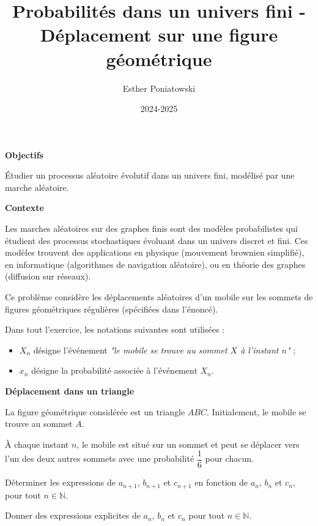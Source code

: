 \documentclass[10pt,a4paper]{article}
\title{Probabilités dans un univers fini - Déplacement sur une figure géométrique}
\author{Esther Poniatowski}
\date{2024-2025}
\begin{document}
\textbf{Objectifs}

Étudier un processus aléatoire évolutif dans un univers fini, modélisé par une marche aléatoire.

\bigskip
\textbf{Contexte}

Les marches aléatoires sur des graphes finis sont des modèles probabilistes qui étudient des
processus stochastiques évoluant dans un univers discret et fini. Ces modèles trouvent des
applications en physique (mouvement brownien simplifié), en informatique (algorithmes de navigation
aléatoire), ou en théorie des graphes (diffusion sur réseaux).


\bigskip

Ce problème considère les déplacements aléatoires d'un mobile sur les sommets de figures
géométriques régulières (spécifiées dans l'énoncé).


Dans tout l'exercice, les notations suivantes sont utilisées :
\begin{itemize}
\item \( X_n \) désigne l'événement \textit{"le mobile se trouve au sommet \( X \) à l'instant \( n
\)"} ;
\item \( x_n \) désigne la probabilité associée à l'événement \( X_n \).
\end{itemize}


\bigskip
\textbf{Déplacement dans un triangle}

La figure géométrique considérée est un triangle \( ABC \). Initialement, le mobile se trouve au
sommet \( A \).

À chaque instant \( n \), le mobile est situé sur un sommet et peut se déplacer vers l'un des deux
autres sommets avec une probabilité \( \dfrac{1}{6} \) pour chacun.

\q Déterminer les expressions de \( a_{n+1} \), \( b_{n+1} \) et \( c_{n+1} \) en fonction de \( a_n
\), \( b_n \) et \( c_n \), pour tout \( n \in \mathbb{N} \).

\q Donner des expressions explicites de \( a_n \), \( b_n \) et \( c_n \) pour tout \( n \in
\mathbb{N} \).
\end{document}
